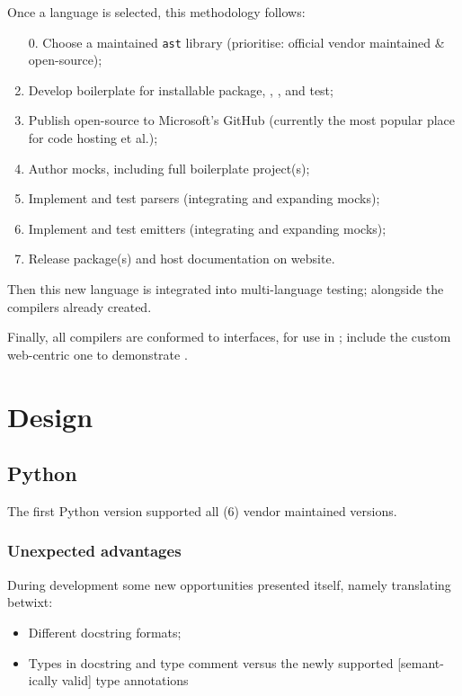 Once a language is selected, this methodology follows:
\begin{enumerate}
    \item[0.] Choose a maintained \texttt{ast} library (prioritise: official vendor maintained \& open-source);
    \item Develop boilerplate for installable package, , , and test;
    \item Publish open-source to Microsoft's GitHub (currently the most popular place for code hosting et al.);
    \item Author mocks, including full boilerplate project(s);
    \item Implement and test parsers (integrating and expanding mocks);
    \item Implement and test emitters (integrating and expanding mocks);
    \item Release package(s) and host documentation on website.
\end{enumerate}

Then this new language is integrated into multi-language testing; alongside the compilers already created.

Finally, all compilers are conformed to  interfaces, for use in ; include the custom web-centric one to demonstrate .

\section{Design}

\subsection{Python}
The first Python version supported all (6) vendor maintained versions.\cite{marksCddpython}

\subsubsection{Unexpected advantages}

During development some new opportunities presented itself, namely translating betwixt:
\begin{itemize}
    \item Different docstring formats;
    \item Types in docstring and type comment versus the newly supported [semant-\\ically valid] type annotations
\end{itemize}

